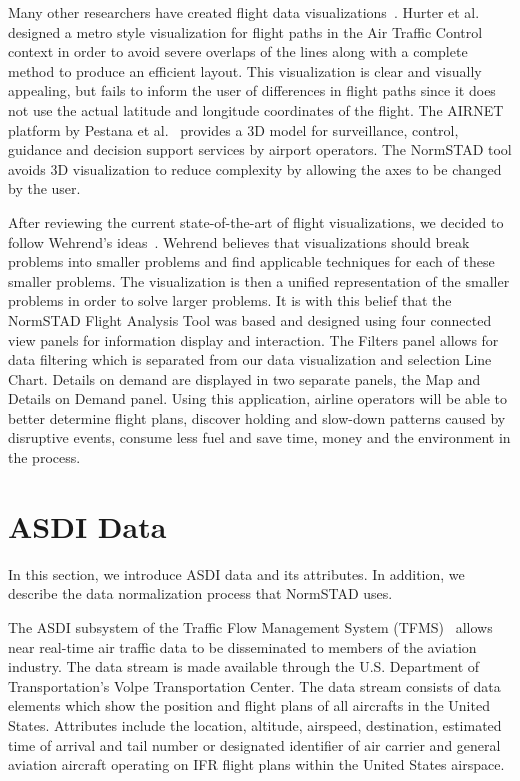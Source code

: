 \documentclass{sig-alternate}
\begin{document}
Many other researchers have created flight data 
visualizations~\cite{Conv2011, Hurter10, Klein06, Palmer08, Pestana05}.
Hurter et al.~\cite{Hurter10} designed a metro style visualization
for flight paths in the Air Traffic Control context in
order to avoid severe overlaps of the lines
along with a complete method to produce an efficient layout.
This visualization is clear and visually appealing, but fails 
to inform the user of differences in flight paths since it 
does not use the actual latitude and longitude coordinates
of the flight. The AIRNET platform by Pestana et al.~\cite{Pestana05}
provides a 3D model for surveillance, control, guidance and decision
support services by airport operators. The NormSTAD tool avoids
3D visualization to reduce complexity by allowing the axes to be changed  
by the user.

After reviewing the current state-of-the-art of flight visualizations,
we decided to follow Wehrend's ideas~\cite{Weh90}. Wehrend believes
that visualizations should break problems into smaller problems
and find applicable techniques for each of these smaller problems.
The visualization is then a unified representation of the smaller
problems in order to solve larger problems. It is with this belief
that the NormSTAD Flight Analysis Tool was based and designed
using four connected view panels for information display and interaction. 
The Filters panel allows for data filtering which is separated from 
our data visualization and selection Line Chart. Details on demand
are displayed in two separate panels, the Map and Details on Demand panel. 
Using this application,
airline operators will be able to better determine flight plans,
discover holding and slow-down patterns caused by disruptive events, consume
less fuel and save time, money and the environment in the process. 



\section{ASDI Data}
\label{sec-asdi}

In this section, we introduce ASDI data and its
attributes. In addition, we describe the data normalization
process that NormSTAD uses.

The ASDI subsystem of the Traffic Flow
Management System (TFMS)~\cite{TFMS} allows near
real-time air traffic data to be disseminated to
members of the aviation industry. The data stream
is made available through the U.S. Department
of Transportation's Volpe Transportation Center.
The data stream consists of data elements which
show the position and flight plans of all aircrafts
in the United States. Attributes include the location, altitude,
airspeed, destination, estimated time of arrival and
tail number or designated identifier of air carrier
and general aviation aircraft operating on IFR flight
plans within the United States airspace.
\end{document}
